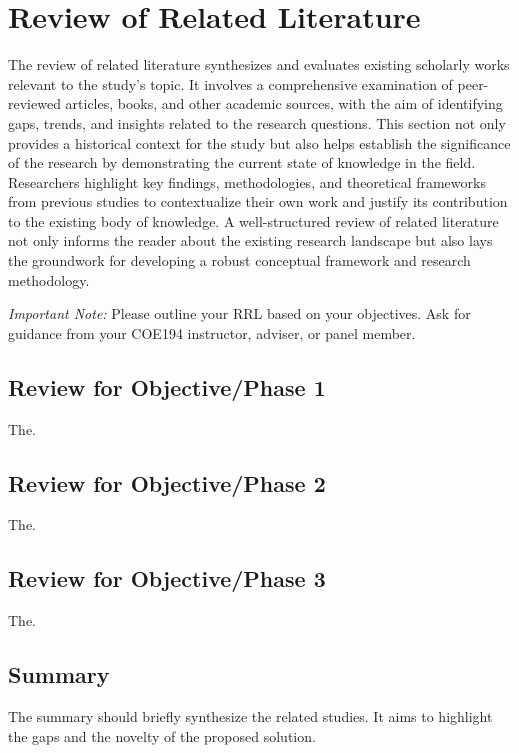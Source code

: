      
\renewcommand{\thechapter}{\Roman{chapter}}
\chapter{Review of Related Literature}
    \thispagestyle{empty} 
    \renewcommand{\thechapter}{\arabic{chapter}}

    The review of related literature synthesizes and evaluates existing scholarly works relevant to the study's topic. It involves a comprehensive examination of peer-reviewed articles, books, and other academic sources, with the aim of identifying gaps, trends, and insights related to the research questions. This section not only provides a historical context for the study but also helps establish the significance of the research by demonstrating the current state of knowledge in the field. Researchers highlight key findings, methodologies, and theoretical frameworks from previous studies to contextualize their own work and justify its contribution to the existing body of knowledge. A well-structured review of related literature not only informs the reader about the existing research landscape but also lays the groundwork for developing a robust conceptual framework and research methodology.

    \textit{Important Note:} Please outline your RRL based on your objectives. Ask for guidance from your COE194 instructor, adviser, or panel member.

\section{Review for Objective/Phase 1}
    The.

\section{Review for Objective/Phase 2}
    The.

\section{Review for Objective/Phase 3}
    The.

\section{Summary}
    The summary should briefly synthesize the related studies. It aims to highlight the gaps and the novelty of the proposed solution.